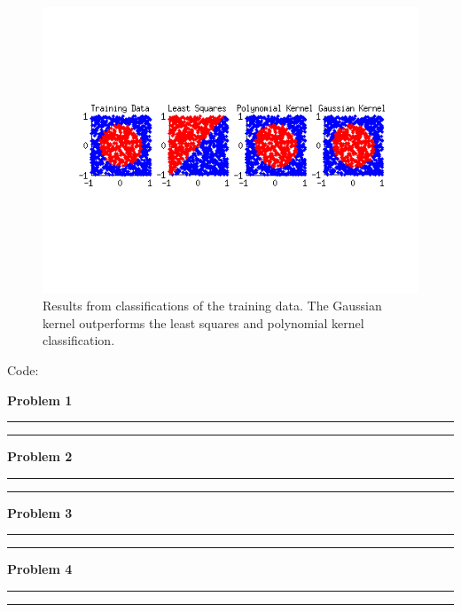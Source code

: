 \documentclass{article}
\begin{document}
\begin{homeworkProblem}
\begin{figure}[!ht]
\begin{centering}
        \includegraphics[width=\linewidth]{fig_prob4.png}

        \caption{\label{fig:prob4} Results from classifications of the training
        data. The Gaussian kernel outperforms the least squares and polynomial
    kernel classification.}
        \end{centering}

    \end{figure} 

\end{homeworkProblem}

\clearpage
{\huge Code:}

{\large \bf Problem 1} \\
 
\hrule \hrule

{\large \bf Problem 2} \\
 
\hrule \hrule

{\large \bf Problem 3} \\
 
\hrule \hrule

{\large \bf Problem 4} \\
 
\hrule \hrule
\end{document}
